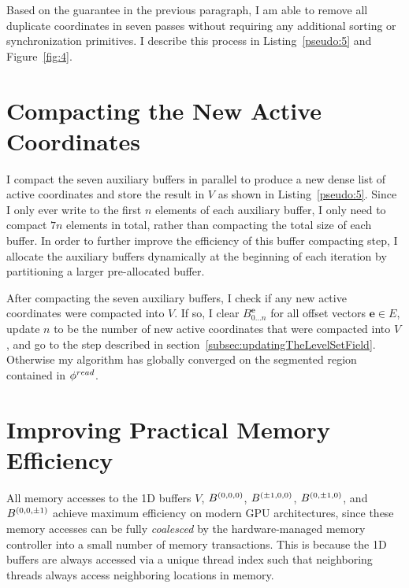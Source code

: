 Based on the guarantee in the previous paragraph, I am able to remove all duplicate coordinates in seven passes without requiring any additional sorting or synchronization primitives. I describe this process in Listing~\ref{pseudo:5} and Figure~\ref{fig:4}.


\section{Compacting the New Active Coordinates}
\label{subsec:compactingTheNewActiveCoordinates} 

I compact the seven auxiliary buffers in parallel to produce a new dense list of active coordinates and store the result in $V$ as shown in Listing~\ref{pseudo:5}. Since I only ever write to the first $n$ elements of each auxiliary buffer, I only need to compact $7n$ elements in total, rather than compacting the total size of each buffer. In order to further improve the efficiency of this buffer compacting step, I allocate the auxiliary buffers dynamically at the beginning of each iteration by partitioning a larger pre-allocated buffer.

After compacting the seven auxiliary buffers, I check if any new active coordinates were compacted into $V$. If so, I clear $B^{\mathbf{e}}_{0 \ldots n}$ for all offset vectors $\mathbf{e} \in E$, update $n$ to be the number of new active coordinates that were compacted into $V$, and go to the step described in section~\ref{subsec:updatingTheLevelSetField}. Otherwise my algorithm has globally converged on the segmented region contained in $\phi^{read}$.


\section{Improving Practical Memory Efficiency}
\label{subsec:improvingPracticalMemoryEfficiency}

All memory accesses to the 1D buffers $V$, $B^{ \left( 0,0,0 \right) }$, $B^{ \left( \pm 1, 0, 0 \right) }$, $B^{ \left( 0, \pm 1, 0 \right) }$, and $B^{ \left( 0, 0, \pm 1 \right) }$ achieve maximum efficiency on modern GPU architectures, since these memory accesses can be fully \emph{coalesced} by the hardware-managed memory controller into a small number of memory transactions. This is because the 1D buffers are always accessed via a unique thread index such that neighboring threads always access neighboring locations in memory.

